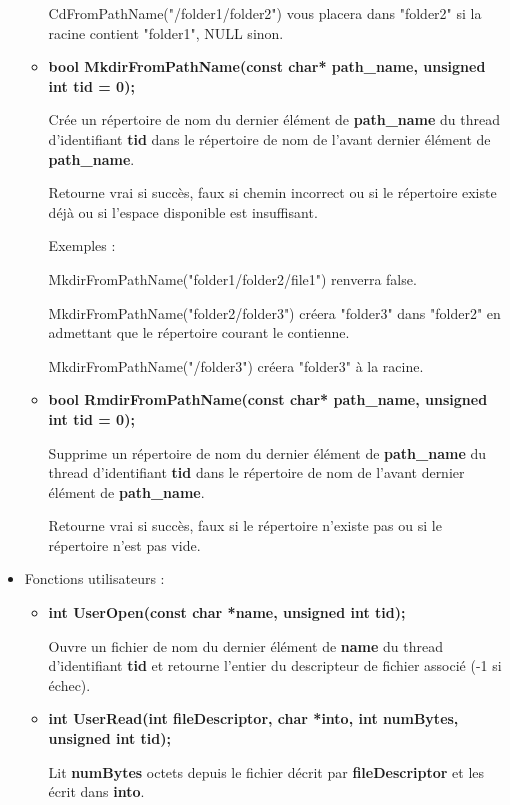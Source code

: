 \documentclass{article}
\begin{document}
\begin{itemize}
\begin{itemize}
     CdFromPathName("/folder1/folder2") vous placera dans "folder2" si la racine contient "folder1", NULL sinon.

     \item
     \textbf{bool MkdirFromPathName(const char* path\_name, unsigned int tid = 0);}

  Crée un répertoire de nom du dernier élément de \textbf{path\_name} du thread d'identifiant \textbf{tid} dans le répertoire de nom de l'avant dernier élément de  \textbf{path\_name}.

  Retourne vrai si succès, faux si chemin incorrect ou si le répertoire existe déjà ou si l'espace disponible est insuffisant.

  Exemples :

  MkdirFromPathName("folder1/folder2/file1") renverra false.

  MkdirFromPathName("folder2/folder3") créera "folder3" dans "folder2" en admettant que le répertoire courant le contienne.

  MkdirFromPathName("/folder3") créera "folder3" à la racine.

 	\item
 	\textbf{bool RmdirFromPathName(const char* path\_name, unsigned int tid = 0);}

  Supprime un répertoire de nom du dernier élément de \textbf{path\_name} du thread d'identifiant \textbf{tid} dans le répertoire de nom de l'avant dernier élément de  \textbf{path\_name}.

  Retourne vrai si succès, faux si le répertoire n'existe pas ou si le répertoire n'est pas vide.


\end{itemize}

\item

Fonctions utilisateurs :

\begin{itemize}

	\item
    \textbf{int UserOpen(const char *name, unsigned int tid);}

	Ouvre un fichier de nom du dernier élément de \textbf{name} du thread d'identifiant \textbf{tid} et retourne l'entier du descripteur de fichier associé (-1 si échec).

	\item
    \textbf{int UserRead(int fileDescriptor, char *into, int numBytes, unsigned int tid);}

	Lit \textbf{numBytes} octets depuis le fichier décrit par \textbf{fileDescriptor} et les écrit dans \textbf{into}.


\end{itemize}
\end{itemize}
\end{document}
